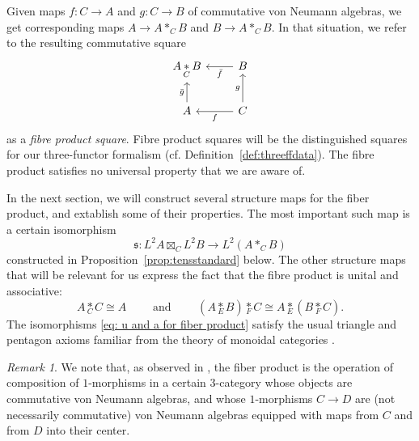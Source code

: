 \documentclass[10pt,a4paper,oneside]{amsart}
\theoremstyle{remark}
\newtheorem{remark}[theorem]{Remark}
\theoremstyle{definition}
\newcommand{\rar}{\rightarrow}
\newcommand{\cofu}[1]{\mathop{\boxtimes}_{#1}}
\newcommand{\tens}[1]{\mathop{*}\limits_{#1}}
\newcommand{\Ltwomap}{\mathfrak{s}}
\newcommand{\vn}[1]{{#1}}
\begin{document}
Given maps $\vn{f}\colon C \rar A$ and $\vn{g}\colon C \rar B$ of commutative von Neumann algebras, we get corresponding maps $ A\rar A \ast_{C} B$ and $ B \rar A \ast_{C}B$. In that situation, we refer to the resulting commutative square
\begin{equation}\label{eq:tenssquare}
	\begin{tikzcd}
		A\tens{C} B &B \arrow[l,"\bar{\vn{f}}"]\\A\arrow[u,"\bar{\vn{g}}"]&	C \arrow[l,"\vn{f}"]\arrow[u,"\vn{g}"]
	\end{tikzcd}
\end{equation}
as a \emph{fibre product square}. Fibre product squares will be the distinguished squares for our three-functor formalism (cf. Definition~\ref{def:threeffdata}).
The fibre product satisfies no universal property that we are aware of.

In the next section, we will construct several structure maps for the fiber product, and extablish some of their properties.
The most important such map is a certain isomorphism
\begin{equation}\label{eq: Ltwomap}
\Ltwomap : L^2 A \cofu{C} L^2 B\longrightarrow L^2(A \ast_{C} B)
\end{equation}
constructed in Proposition~\ref{prop:tensstandard} below.
The other structure maps that will be relevant for us express the fact that 
the fibre product is unital and associative:
\begin{equation}\label{eq: u and a for fiber product}
A \tens{C} C \cong A
\qquad\text{ and }\qquad 
	(A\tens{E}B)\tens{F}C \cong A\tens{E}(B\tens{F}C).
\end{equation}
The isomorphisms \eqref{eq: u and a for fiber product}
satisfy the usual triangle and pentagon axioms familiar from the theory of monoidal categories \cite[Proposition 9.2.8]{Timmermann2008}.

\begin{remark}
We note that, as observed in \cite[Exa.\,C.2]{Fer:2404.05193}, the fiber product is the operation of composition of $1$-morphisms in a certain 3-category whose objects are commutative von Neumann algebras, and whose $1$-morphisms $C\to D$ are (not necessarily commutative) von Neumann algebras equipped with maps from $C$ and from $D$ into their center.
\end{remark}
\end{document}
